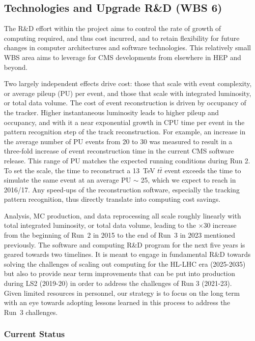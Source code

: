 \documentclass[11pt,a4paper]{article}
\begin{document}
\subsection{Technologies and Upgrade R\&D (WBS 6)}

The R\&D effort within the project aims to control the rate of growth of 
computing required, and thus cost incurred, and to retain flexibility for 
future changes in computer architectures and software technologies. This 
relatively small WBS area aims to leverage for CMS developments from 
elsewhere in HEP and beyond. 

Two largely independent effects drive cost:
those that scale with event complexity, or average pileup (PU) per event, 
and those that scale with integrated luminosity, or total data volume.
The cost of event reconstruction is driven by occupancy of the tracker.
Higher instantaneous luminosity leads to higher pileup and occupancy, and
with it a near exponential growth in CPU time per event in the pattern
recognition step of the track reconstruction.  For example, an increase in
the average number of PU events from 20 to 30 was measured to result in a
three-fold increase of event reconstruction time in the current CMS software
release.  This range of PU matches the expected running conditions during
Run 2.  To set the scale, the time to reconstruct a 13~TeV $t\bar{t}$ event
exceeds the time to simulate the same event at an average PU $\sim$ 25,
which we expect to reach in 2016/17.  Any speed-ups of the
reconstruction software, especially the tracking pattern recognition, thus
directly translate into computing cost savings.

Analysis, MC production, and data reprocessing all scale roughly linearly
with total integrated luminosity, or total data volume, leading to the
$\times 30$ increase from the beginning of Run~2 in 2015 to the end of
Run~3 in 2023 mentioned previously.  The software and computing R\&D program
for the next five years is geared towards two timelines. It is meant to engage
in fundamental R\&D towards solving the challenges of scaling out computing
for the HL-LHC era (2025-2035) but also to provide near term
improvements that can be put into production during LS2 (2019-20) in order
to address the challenges of Run 3 (2021-23). Given limited resources in
personnel, our strategy is to focus on the long term with an eye towards
adopting lessons learned in this process to address the Run~3 challenges.

\subsubsection{Current Status}
\end{document}

